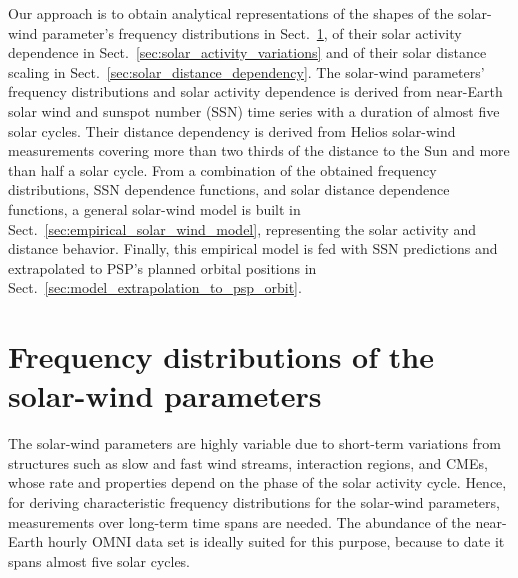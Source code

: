 \documentclass[]{aa}
\begin{document}
        Our approach is to obtain analytical representations of the shapes of the solar-wind parameter’s frequency distributions in Sect.~\ref{sec:frequency_distribution}, of their solar activity dependence in Sect.~\ref{sec:solar_activity_variations} and of their solar distance scaling in Sect.~\ref{sec:solar_distance_dependency}. The solar-wind parameters’ frequency distributions and solar activity dependence is derived from near-Earth solar wind and sunspot number (SSN) time series with a duration of almost five solar cycles. Their distance dependency is derived from Helios solar-wind measurements covering more than two thirds of the distance to the Sun and more than half a solar cycle. From a combination of the obtained frequency distributions, SSN dependence functions, and solar distance dependence functions, a general solar-wind model is built in Sect.~\ref{sec:empirical_solar_wind_model}, representing the solar activity and distance behavior. Finally, this empirical model is fed with SSN predictions and extrapolated to PSP's planned orbital positions in Sect.~\ref{sec:model_extrapolation_to_psp_orbit}.

        \section{Frequency distributions of the solar-wind parameters}
        \label{sec:frequency_distribution}
        The solar-wind parameters are highly variable due to short-term variations from structures such as slow and fast wind streams, interaction regions, and CMEs, whose rate and properties depend on the phase of the solar activity cycle. Hence, for deriving characteristic frequency distributions for the solar-wind parameters, measurements over long-term time spans are needed. The abundance of the near-Earth hourly OMNI data set is ideally suited for this purpose, because to date it spans almost five solar cycles.
\end{document}
